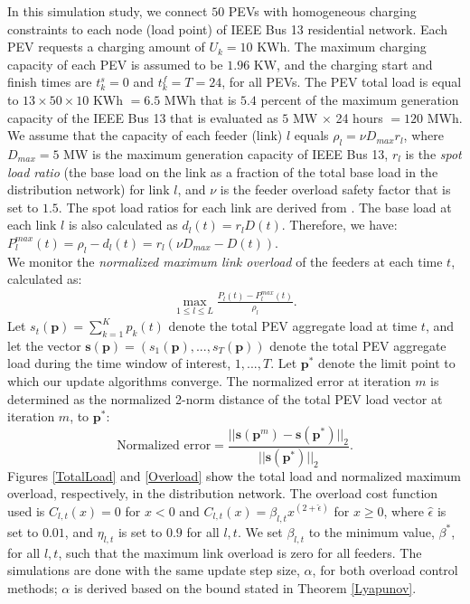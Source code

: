 \documentclass[12pt,draftcls,onecolumn]{IEEEtran}
\begin{document}
In this simulation study, we connect $50$ PEVs with homogeneous charging constraints to each node (load point) of IEEE Bus 13 residential network. Each PEV requests a charging amount of $U_k = 10$ KWh.  The maximum charging capacity of each PEV is assumed to be $1.96$ KW, and the charging start and finish times are $t_k^s=0$ and $t_k^f=T=24$, for all PEVs. The PEV total load is equal to $13 \times 50 \times 10$ KWh $= 6.5$ MWh that is $5.4$ percent of the maximum generation capacity of the IEEE Bus 13 that is evaluated as $5$ MW $\times$ 24 hours $= 120$ MWh. We assume that the capacity of each feeder (link) $l$ equals $\rho_l = \nu D_{max} r_l$, where $D_{max}=5$ MW is the maximum generation capacity of IEEE Bus 13, $r_l$ is the \textit{spot load ratio} (the base load on the link as a fraction of the total base load in the distribution network) for link $l$, and $\nu$ is the feeder overload safety factor that is set to $1.5$. The spot load ratios for each link are derived from \cite{B13}. The base load at each link $l$ is also calculated as $d_l(t)=r_l D(t)$. Therefore, we have: $P_l^{max}(t)=\rho_l-d_l(t) = r_l(\nu D_{max} - D(t))$.\\
We monitor the \textit{normalized maximum link overload} of the feeders at each time $t$, calculated as:
\begin{gather}
\max_{1 \leq l \leq L}\frac{P_l(t)-P_l^{max}(t)}{\rho_l}.
\label{NormOver}
\end{gather}
Let $s_t(\mathbf{p})=\sum_{k=1}^{K}p_k(t)$ denote the total PEV aggregate load at time $t$, and let the vector $\mathbf{s}(\mathbf{p})=(s_1(\mathbf{p}), ..., s_{T}(\mathbf{p}))$ denote the total PEV aggregate load during the time window of interest, $1, ..., T$. Let $\mathbf{p}^*$ denote the limit point to which our update algorithms converge. The normalized error at iteration $m$ is determined as the normalized 2-norm distance of the total PEV load vector at iteration $m$, to $\mathbf{p}^{*}$:
\begin{equation}
\text{Normalized error}=\frac{||\mathbf{s}(\mathbf{p}^{m})-\mathbf{s}(\mathbf{p}^*)||_2}{||\mathbf{s}(\mathbf{p}^*)||_2}. 
\end{equation}
Figures \ref{TotalLoad} and \ref{Overload} show the total load and normalized maximum overload, respectively, in the distribution network. The overload cost function used is $C_{l,t}(x)=0$ for $x<0$ and $C_{l,t}(x)=\beta_{l,t} x^{(2+\hat{\epsilon})}$ for $x \geq 0$, where $\hat{\epsilon}$ is set to $0.01$, and $\eta_{l,t}$ is set to $0.9$ for all $l,t$. We set $\beta_{l,t}$ to the minimum value, $\beta^*$, for all $l,t$, such that the maximum link overload is zero for all feeders. The simulations are done with the same update step size, $\alpha$, for both overload control methods; $\alpha$ is derived based on the bound stated in Theorem \ref{Lyapunov}. 
\end{document}
